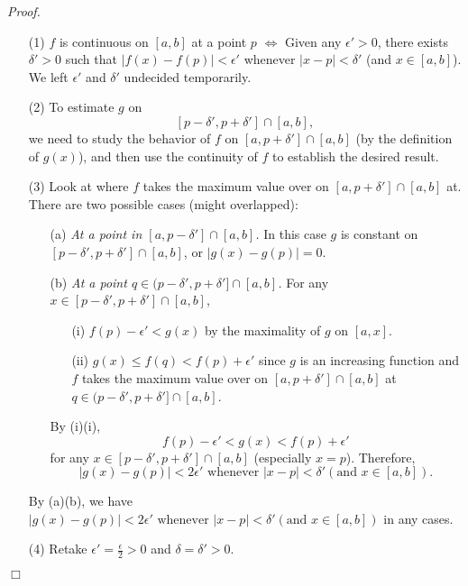 \documentclass{article}
\begin{document}
\emph{Proof.}
\begin{enumerate}
\item[(1)]
$f$ is continuous on $[a,b]$ at a point $p$ $\Longleftrightarrow$
Given any $\epsilon' > 0$, there exists $\delta' > 0$ such that
$|f(x) - f(p)| < \epsilon'$ whenever $|x-p| < \delta'$ (and $x \in [a,b]$).
We left $\epsilon'$ and $\delta'$ undecided temporarily.
\item[(2)]
To estimate $g$ on
$$[p-\delta', p+\delta'] \cap [a,b],$$
we need to study the behavior of $f$ on $[a,p+\delta'] \cap [a,b]$
(by the definition of $g(x)$),
and then use the continuity of $f$ to establish the desired result.
\item[(3)]
Look at where $f$ takes the maximum value over on $[a,p+\delta'] \cap [a,b]$ at.
There are two possible cases (might overlapped):
  \begin{enumerate}
  \item[(a)]
  \emph{At a point in $[a,p-\delta'] \cap [a,b]$.}
  In this case $g$ is constant on $[p-\delta', p+\delta'] \cap [a,b]$,
  or $|g(x) - g(p)| = 0$.
  \item[(b)]
  \emph{At a point $q \in (p-\delta',p+\delta'] \cap [a,b]$.}
  For any $x \in [p-\delta', p+\delta'] \cap [a,b]$,
    \begin{enumerate}
    \item[(i)]
    $f(p) - \epsilon' < g(x)$ by the maximality of $g$ on $[a,x]$.
    \item[(ii)]
    $g(x) \leq f(q) < f(p) + \epsilon'$
    since $g$ is an increasing function and
    $f$ takes the maximum value over on $[a,p+\delta'] \cap [a,b]$ at
    $q \in (p-\delta',p+\delta'] \cap [a,b]$.
    \end{enumerate}
  By (i)(i),
  $$f(p) - \epsilon' < g(x) < f(p) + \epsilon'$$
  for  any $x \in [p-\delta', p+\delta'] \cap [a,b]$ (especially $x = p$).
  Therefore,
  $$|g(x) - g(p)| < 2 \epsilon'
  \text{ whenever } |x-p| < \delta' (\text{and } x \in [a,b]).$$

  \end{enumerate}
  By (a)(b), we have
  $|g(x) - g(p)| < 2 \epsilon'
  \text{ whenever } |x-p| < \delta' (\text{and } x \in [a,b])$ in any cases.
\item[(4)]
Retake $\epsilon' = \frac{\epsilon}{2} > 0$ and $\delta = \delta' > 0$.
\end{enumerate}
$\Box$ \\\\
\end{document}

